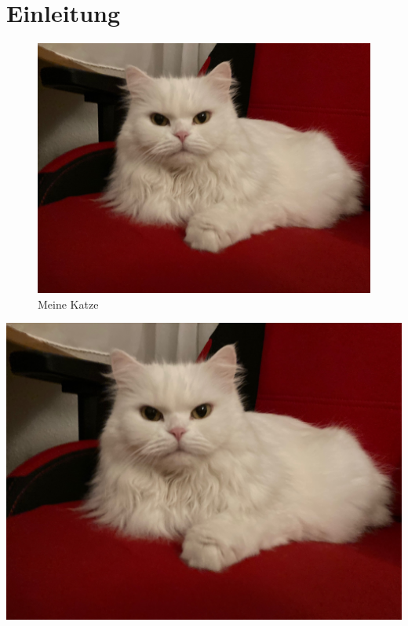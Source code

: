 \chapter{Einleitung}\label{cha:Einleitung}

\blindtext[5]

\begin{figure}
\includegraphics[width=\textwidth]{Bilder/Katze}
\caption{Meine Katze}\label{fig:Katze}
\end{figure}

\blindtext[5]

\includegraphics[width=\textwidth]{Bilder/Katze}
\label{fig:Katze2}

